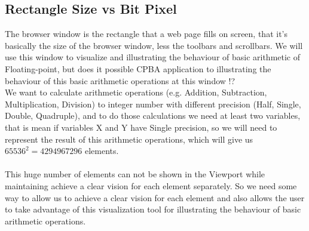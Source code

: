 \documentclass[11pt]{article}
\begin{document}
\subsection{Rectangle Size vs Bit Pixel}%
The browser window is the rectangle that a web page fills on screen, that it’s basically the size of the browser window, less the toolbars and scrollbars. We will use this window to visualize and illustrating the behaviour of basic arithmetic of Floating-point, but does it possible CPBA application to illustrating the behaviour of this basic arithmetic operations at this window !?\\

We want to calculate arithmetic operations (e.g. Addition, Subtraction, Multiplication, Division) to integer number with different precision (Half, Single, Double, Quadruple), and to do those calculations we need at least two variables, that is mean if variables X and Y have Single precision, so we will need to represent the result of this arithmetic operations, which will give us $65536^{2} = 4294967296$ elements.\\\\
This huge number of elements can not be shown in the Viewport while maintaining achieve a clear vision for each element separately. So we need some way to allow us to achieve a clear vision for each element and also allows the user to take advantage of this visualization tool for illustrating the behaviour of basic arithmetic operations.\\
\end{document}
